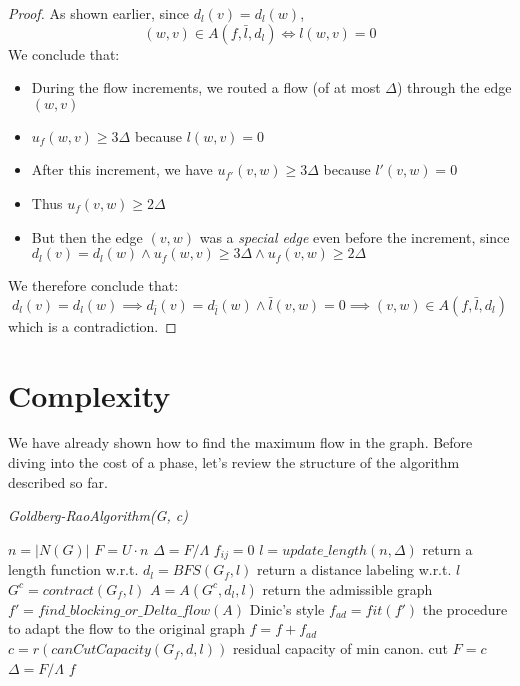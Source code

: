 \begin{proof}
            As shown earlier, since \( d_l(v) = d_l(w) \),  
            \[
            (w,v) \in A(f,\bar{l}, d_l) \iff l(w,v) = 0
            \]  
            We conclude that:
            \begin{itemize}
                \item During the flow increments, we routed a flow (of at most \( \Delta \)) through the edge \( (w,v) \)
                \item \( u_f(w,v) \geq 3\Delta \) because \( l(w,v) = 0 \)
                \item After this increment, we have \( u_{f'}(v,w) \geq 3\Delta \) because \( l'(v,w) = 0 \)
                \item Thus \( u_f(v,w) \geq 2\Delta \)
                \item But then the edge \( (v,w) \) was a \textit{special edge} even before the increment, since \( d_l(v) = d_l(w) \land u_f(w,v) \geq 3\Delta \land u_f(v,w) \geq 2\Delta \)
            \end{itemize}
            We therefore conclude that:
            \[
            d_l(v) = d_l(w) \implies d_{\bar{l}}(v) = d_{\bar{l}}(w) \land \bar{l}(v,w) = 0 \implies (v,w) \in A(f,\bar{l}, d_l)
            \]
            which is a contradiction.
            
\end{proof}

\section{Complexity}
    We have already shown how to find the maximum flow in the graph.
    Before diving into the cost of a phase, let's review the structure of the algorithm described so far.

    \begin{algorithm}
        \caption{\textit{Goldberg-RaoAlgorithm(G, c)}}
        \label{GoldbergRao}
        \begin{algorithmic}[1]
            \State $n = |N(G)|$
            \State $F = U\cdot n$
            \State $\Delta = F/ \Lambda$
                $f_{ij} = 0$
            \EndFor
                \State $l = update\_length(n, \Delta)$ \Comment return a length function w.r.t. \dlt
                \State $d_l = BFS(G_f, l)$ \Comment return a distance labeling w.r.t. $l$
                \State $G^c = contract(G_f, l)$ 
                \State $A = A(G^c, d_l, l)$ \Comment return the admissible graph
                \State $f' = find\_blocking\_or\_Delta\_flow(A)$ \Comment Dinic's style 
                \State $f_{ad} = fit(f')$ \Comment the procedure to adapt the flow to the original graph
                \State $f = f + f_{ad}$
                \State $c = r(canCutCapacity(G_f,d, l))$ \Comment residual capacity of min canon. cut 
                    \State $F = c$
                    \State $\Delta = F/\Lambda$
                \EndIf
            \EndWhile 
            \State \Return $f$
        \end{algorithmic}
    \end{algorithm}

